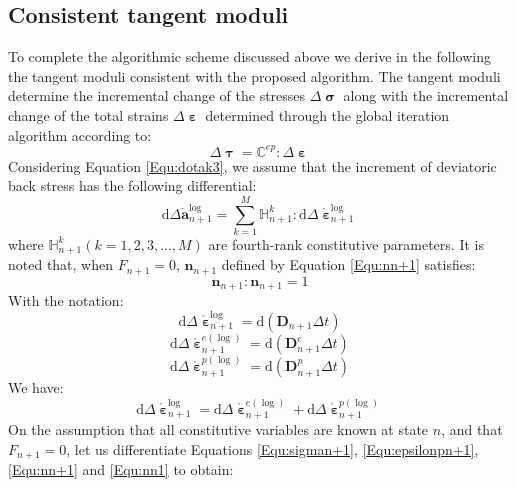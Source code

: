 \subsection{Consistent tangent moduli}
To complete the algorithmic scheme discussed above we derive in the following the tangent moduli consistent with the proposed algorithm. The tangent moduli determine the incremental change of the stresses $\Delta {\bm{\upsigma }}$ along with the incremental change of the total strains $\Delta {\bm{\upepsilon }}$ determined through the global iteration algorithm according to:
\begin{equation}
\Delta {\bm{\uptau }} = {\mathbb{C}^{ep}}:\Delta {\bm{\upepsilon }}
\end{equation}
Considering Equation \ref{Equ:dotak3}, we assume that the increment of deviatoric back stress has the following differential:
\begin{equation}
\label{Equ:dan+1}
{\text{d}}\Delta \mathring {\mathbf{a}}_{n + 1}^{\log } = \sum\limits_{k = 1}^M {\mathbb{H}_{n + 1}^k} :{\text{d}}\Delta \mathring {\bm{\upepsilon}}_{n + 1}^{\log }
\end{equation}
where $\mathbb{H}_{n + 1}^k( k = 1,2,3,...,M )$ are fourth-rank constitutive parameters.
It is noted that, when ${F_{n + 1}} = 0$, ${\mathbf{n}}_{n + 1}$ defined by Equation \ref{Equ:nn+1} satisfies:
\begin{equation}
\label{Equ:nn1}
{{\mathbf{n}}_{n + 1}}:{{\mathbf{n}}_{n + 1}} = 1
\end{equation}
With the notation:
\begin{equation}
{\text{d}}\Delta \mathring {\bm{\upepsilon}}_{n + 1}^{\log } = {\text{d}}(\mathbf{D}_{n+1} \Delta t)
\end{equation}
\begin{equation}
{\text{d}}\Delta \mathring {\bm{\upepsilon}}_{n + 1}^{e(\log) } = {\text{d}}(\mathbf{D}_{n+1}^e \Delta t)
\end{equation}
\begin{equation}
{\text{d}}\Delta \mathring {\bm{\upepsilon}}_{n + 1}^{p(\log) } = {\text{d}}(\mathbf{D}_{n+1}^p \Delta t)
\end{equation}
We have:
\begin{equation}
{\text{d}}\Delta \mathring {\bm{\upepsilon}}_{n + 1}^{\log } = {\text{d}}\Delta \mathring {\bm{\upepsilon}}_{n + 1}^{e(\log) } + {\text{d}}\Delta \mathring {\bm{\upepsilon}}_{n + 1}^{p(\log) }
\end{equation}
On the assumption that all constitutive variables are known at state $n$, and that $F_{n+1}=0$, let us differentiate Equations \ref{Equ:sigman+1}, \ref{Equ:epsilonpn+1}, \ref{Equ:nn+1} and \ref{Equ:nn1} to obtain:
